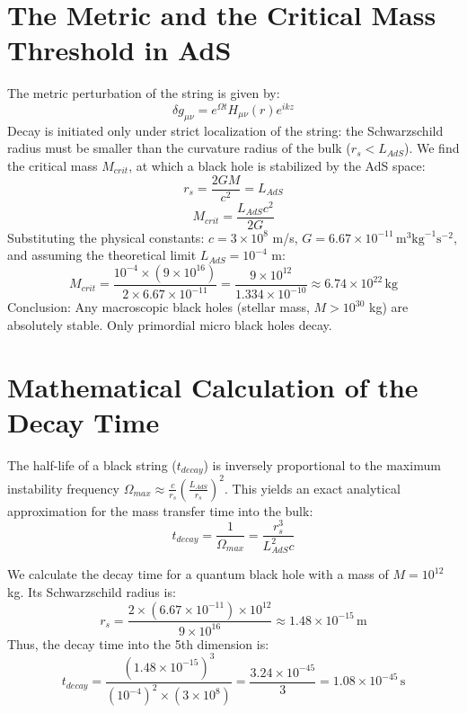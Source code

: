 \documentclass[aps,prd,reprint,superscriptaddress,nofootinbib]{revtex4-2}
\begin{document}
\section{The Metric and the Critical Mass Threshold in AdS}
The metric perturbation of the string is given by:
\begin{equation}
\delta g_{\mu\nu} = e^{\Omega t} H_{\mu\nu}(r) e^{i k z}
\end{equation}
Decay is initiated only under strict localization of the string: the Schwarzschild radius must be smaller than the curvature radius of the bulk ($r_s < L_{AdS}$).
We find the critical mass $M_{crit}$, at which a black hole is stabilized by the AdS space:
\begin{equation}
r_s = \frac{2G M}{c^2} = L_{AdS}
\end{equation}
\begin{equation}
M_{crit} = \frac{L_{AdS} c^2}{2G}
\end{equation}
Substituting the physical constants: $c = 3 \times 10^8$ m/s, $G = 6.67 \times 10^{-11} \, \text{m}^3\text{kg}^{-1}\text{s}^{-2}$, and assuming the theoretical limit $L_{AdS} = 10^{-4}$ m:
\begin{equation}
M_{crit} = \frac{10^{-4} \times (9 \times 10^{16})}{2 \times 6.67 \times 10^{-11}} = \frac{9 \times 10^{12}}{1.334 \times 10^{-10}} \approx 6.74 \times 10^{22} \, \text{kg}
\end{equation}
Conclusion: Any macroscopic black holes (stellar mass, $M > 10^{30}$ kg) are absolutely stable. Only primordial micro black holes decay.

\section{Mathematical Calculation of the Decay Time}
The half-life of a black string ($t_{decay}$) is inversely proportional to the maximum instability frequency $\Omega_{max} \approx \frac{c}{r_s} \left(\frac{L_{AdS}}{r_s}\right)^2$. This yields an exact analytical approximation for the mass transfer time into the bulk:
\begin{equation}
t_{decay} = \frac{1}{\Omega_{max}} = \frac{r_s^3}{L_{AdS}^2 c}
\end{equation}

We calculate the decay time for a quantum black hole with a mass of $M = 10^{12}$ kg.
Its Schwarzschild radius is:
\begin{equation}
r_s = \frac{2 \times (6.67 \times 10^{-11}) \times 10^{12}}{9 \times 10^{16}} \approx 1.48 \times 10^{-15} \, \text{m}
\end{equation}
Thus, the decay time into the 5th dimension is:
\begin{equation}
t_{decay} = \frac{(1.48 \times 10^{-15})^3}{(10^{-4})^2 \times (3 \times 10^8)} = \frac{3.24 \times 10^{-45}}{3} = 1.08 \times 10^{-45} \, \text{s}
\end{equation}
\end{document}
